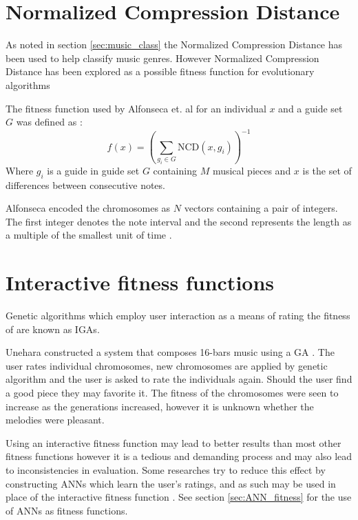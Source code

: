 \section{Normalized Compression Distance} \label{sec:ncdfitness}
As noted in section \ref{sec:music_class} the Normalized Compression Distance has been used to help classify music genres. However Normalized Compression Distance has been explored as a possible fitness function for evolutionary algorithms \cite{Alfonseca2007,Alfonseca:2005:ECM:1981094.1981161,Alfonseca2006}

The fitness function used by Alfonseca et. al for an individual $x$ and a guide set $G$ was defined as \cite{Alfonseca2006}: 
\begin{equation}f(x) = \left( \sum_{g_i\in G} \text{NCD}(x,g_i) \right)^{-1} \label{eq:ncdfitness} \end{equation}
Where $g_i$ is a guide in guide set $G$ containing $M$ musical pieces and $x$ is the set of differences between consecutive notes.

Alfonseca encoded the chromosomes as $N$ vectors containing a pair of integers. The first integer denotes the note interval and the second represents the length as a multiple of the smallest unit of time \cite{Alfonseca2007}.


\section{Interactive fitness functions} \label{sec:iga}
Genetic algorithms which employ user interaction as a means of rating the fitness of are known as \acfp{IGA}.

Unehara constructed a system that composes 16-bars music using a GA \cite{Unehara}. The user rates individual chromosomes, new chromosomes are applied by genetic algorithm and the user is asked to rate the individuals again. Should the user find a good piece they may favorite it. The fitness of the chromosomes were seen to increase as the generations increased, however it is unknown whether the melodies were pleasant.

Using an interactive fitness function may lead to better results than most other fitness functions however it is a tedious and demanding process and may also lead to inconsistencies in evaluation.
Some researches try to reduce this effect by constructing \acp{ANN} which learn the user's ratings, and as such may be used in place of the interactive fitness function \cite{Biles1996,Spector_inductionand}. See section \ref{sec:ANN_fitness} for the use of \acp{ANN} as fitness functions.

